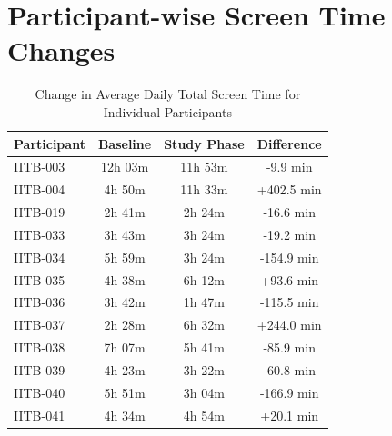 \documentclass[11pt]{report}
\begin{document}
\chapter{Participant-wise Screen Time Changes}
\begin{table}[H]
\centering
\caption{Change in Average Daily Total Screen Time for Individual Participants}
\label{tab:appendix_screen_time_change}
\small
\begin{tabular}{|l|c|c|c|}
\hline
\textbf{Participant} &
\textbf{Baseline} &
\textbf{Study Phase} &
\textbf{Difference} \\
\hline

IITB-003 & 12h 03m & 11h 53m & -9.9 min \\
\hline
IITB-004 & 4h 50m & 11h 33m & +402.5 min \\
\hline
IITB-019 & 2h 41m & 2h 24m & -16.6 min \\
\hline
IITB-033 & 3h 43m & 3h 24m & -19.2 min \\
\hline
IITB-034 & 5h 59m & 3h 24m & -154.9 min \\
\hline
IITB-035 & 4h 38m & 6h 12m & +93.6 min \\
\hline
IITB-036 & 3h 42m & 1h 47m & -115.5 min \\
\hline
IITB-037 & 2h 28m & 6h 32m & +244.0 min \\
\hline
IITB-038 & 7h 07m & 5h 41m & -85.9 min \\
\hline
IITB-039 & 4h 23m & 3h 22m & -60.8 min \\
\hline
IITB-040 & 5h 51m & 3h 04m & -166.9 min \\
\hline
IITB-041 & 4h 34m & 4h 54m & +20.1 min \\
\hline

\end{tabular}
\end{table}





\end{document}
